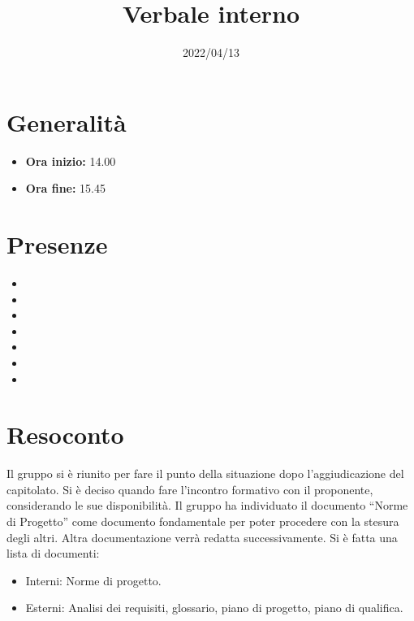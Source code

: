\documentclass{classes/base}
\title{Verbale interno}
\date{2022/04/13}
\author{\angela}
\renewcommand{\maketitle}{
    
}
\begin{document}
    \maketitle

    \section*{Generalità}
    \begin{itemize}
        \item \textbf{Ora inizio:} 14.00
        \item \textbf{Ora fine:} 15.45
    \end{itemize}

    \section*{Presenze}
    \begin{itemize}
     	\item \angela
     	\item \marcob
        \item \tommaso
        \item \ruth
        \item \matteo
        \item \marcov
        \item \giulio
    \end{itemize}

    \section*{Resoconto}
    Il gruppo si è riunito per fare il punto della situazione dopo l’aggiudicazione del capitolato.
    Si è deciso quando fare l’incontro formativo con il proponente, considerando le sue disponibilità.
    Il gruppo ha individuato il documento “Norme di Progetto” come documento fondamentale per poter procedere con la stesura degli altri.
    Altra documentazione verrà redatta successivamente. Si è fatta una lista di documenti:
    \begin{itemize}
        \item Interni: Norme di progetto.
        \item Esterni: Analisi dei requisiti, glossario, piano di progetto, piano di qualifica.
    \end{itemize}
\end{document}
